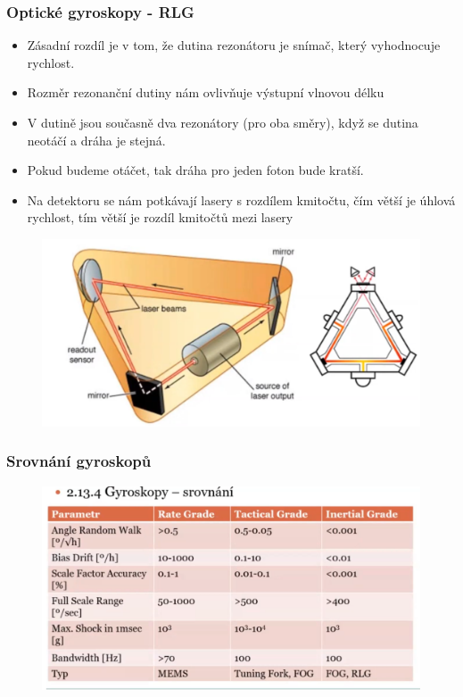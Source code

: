 \subsubsection*{Optické gyroskopy - RLG}
\begin{itemize}
    \item Zásadní rozdíl je v tom, že dutina rezonátoru je snímač, který vyhodnocuje rychlost.
    \item Rozměr rezonanční dutiny nám ovlivňuje výstupní vlnovou délku
    \item V dutině jsou současně dva rezonátory (pro oba směry), když se dutina neotáčí a dráha je stejná.
    \item Pokud budeme otáčet, tak dráha pro jeden foton bude kratší.
    \item Na detektoru se nám potkávají lasery s rozdílem kmitočtu, čím větší je úhlová rychlost, tím větší je rozdíl kmitočtů mezi lasery
\end{itemize}

\begin{figure}[h]
    \centering
    \includegraphics[scale = 0.40]{img/lgr.png}
\end{figure}

\subsubsection*{Srovnání gyroskopů}
\begin{figure}[h]
    \centering
    \includegraphics[scale = 0.40]{img/srovnaini.png}
\end{figure}

